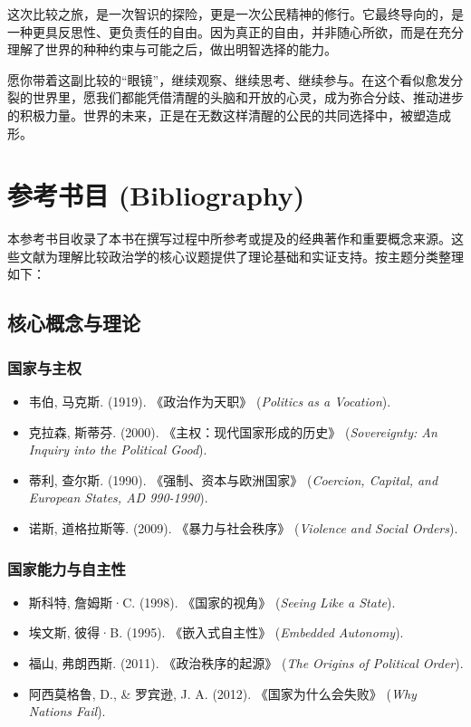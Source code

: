 \documentclass[a5paper, 11pt, openany]{ctexbook}
\begin{document}
这次比较之旅，是一次智识的探险，更是一次公民精神的修行。它最终导向的，是一种更具反思性、更负责任的自由。因为真正的自由，并非随心所欲，而是在充分理解了世界的种种约束与可能之后，做出明智选择的能力。

愿你带着这副比较的“眼镜”，继续观察、继续思考、继续参与。在这个看似愈发分裂的世界里，愿我们都能凭借清醒的头脑和开放的心灵，成为弥合分歧、推动进步的积极力量。世界的未来，正是在无数这样清醒的公民的共同选择中，被塑造成形。

\appendix
\chapter{参考书目 (Bibliography)}

本参考书目收录了本书在撰写过程中所参考或提及的经典著作和重要概念来源。这些文献为理解比较政治学的核心议题提供了理论基础和实证支持。按主题分类整理如下：

\section*{核心概念与理论}

\subsection*{国家与主权}
\begin{itemize}
    \item 韦伯, 马克斯. (1919). 《政治作为天职》 (\textit{Politics as a Vocation}).
    \item 克拉森, 斯蒂芬. (2000). 《主权：现代国家形成的历史》 (\textit{Sovereignty: An Inquiry into the Political Good}).
    \item 蒂利, 查尔斯. (1990). 《强制、资本与欧洲国家》 (\textit{Coercion, Capital, and European States, AD 990-1990}).
    \item 诺斯, 道格拉斯等. (2009). 《暴力与社会秩序》 (\textit{Violence and Social Orders}).
\end{itemize}

\subsection*{国家能力与自主性}
\begin{itemize}
    \item 斯科特, 詹姆斯·C. (1998). 《国家的视角》 (\textit{Seeing Like a State}).
    \item 埃文斯, 彼得·B. (1995). 《嵌入式自主性》 (\textit{Embedded Autonomy}).
    \item 福山, 弗朗西斯. (2011). 《政治秩序的起源》 (\textit{The Origins of Political Order}).
    \item 阿西莫格鲁, D., \& 罗宾逊, J. A. (2012). 《国家为什么会失败》 (\textit{Why Nations Fail}).
\end{itemize}
\end{document}
